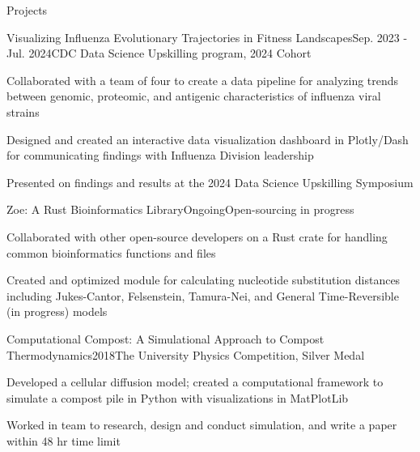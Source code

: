 \documentclass{resume} %
\begin{document}
\begin{rSection}{Projects}
\begin{rSubsection}{Visualizing Influenza Evolutionary Trajectories in Fitness Landscapes}{Sep. 2023 - Jul. 2024}{CDC Data Science Upskilling program, 2024 Cohort}{}
\item Collaborated with a team of four to create a data pipeline for analyzing trends between genomic, proteomic, and antigenic characteristics of influenza viral strains
\item Designed and created an interactive data visualization dashboard in Plotly/Dash for communicating findings with Influenza Division leadership
\item Presented on findings and results at the 2024 Data Science Upskilling Symposium
\end{rSubsection}

\begin{rSubsection}{Zoe: A Rust Bioinformatics Library}{Ongoing}{Open-sourcing in progress}{}
\item Collaborated with other open-source developers on a Rust crate for handling common bioinformatics functions and files
\item Created and optimized module for calculating nucleotide substitution distances including Jukes-Cantor, Felsenstein, Tamura-Nei, and General Time-Reversible (in progress) models
\end{rSubsection}

\begin{rSubsection}{Computational Compost: A Simulational Approach to Compost Thermodynamics}{2018}{The University Physics Competition, Silver Medal}{}
\item Developed a cellular diffusion model; created a computational framework to simulate a compost pile in Python with visualizations in MatPlotLib
\item Worked in team to research, design and conduct simulation, and write a paper within 48 hr time limit
\end{rSubsection}


\end{rSection}
\end{document}
